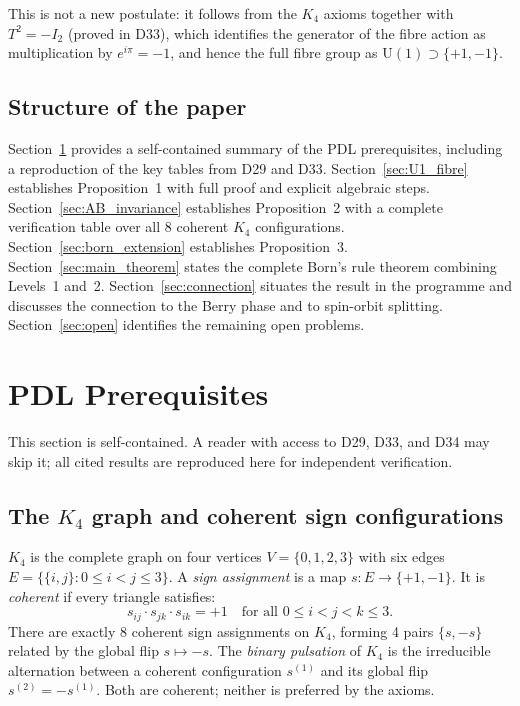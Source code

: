 \documentclass[12pt,a4paper]{article}
\begin{document}
This is not a new postulate: it follows from the $K_4$ axioms together with $T^2 = -I_2$
(proved in D33), which identifies the generator of the fibre action as multiplication
by $e^{i\pi} = -1$, and hence the full fibre group as $\mathrm{U}(1) \supset \{+1,-1\}$.

\subsection{Structure of the paper}

Section~\ref{sec:prereq} provides a self-contained summary of the PDL prerequisites,
including a reproduction of the key tables from D29 and D33. Section~\ref{sec:U1_fibre}
establishes Proposition~1 with full proof and explicit algebraic steps.
Section~\ref{sec:AB_invariance} establishes Proposition~2 with a complete verification
table over all 8 coherent $K_4$ configurations. Section~\ref{sec:born_extension}
establishes Proposition~3. Section~\ref{sec:main_theorem} states the complete Born's rule
theorem combining Levels~1 and~2. Section~\ref{sec:connection} situates the result
in the programme and discusses the connection to the Berry phase and to spin-orbit
splitting. Section~\ref{sec:open} identifies the remaining open problems.

\section{PDL Prerequisites}
\label{sec:prereq}

This section is self-contained. A reader with access to D29, D33, and D34 may skip it;
all cited results are reproduced here for independent verification.

\subsection{The \texorpdfstring{$K_4$}{K4} graph and coherent sign configurations}
\label{subsec:K4}

$K_4$ is the complete graph on four vertices $V = \{0,1,2,3\}$ with six edges
$E = \{\{i,j\} : 0 \leq i < j \leq 3\}$. A \emph{sign assignment} is a map
$s : E \to \{+1,-1\}$. It is \emph{coherent} if every triangle satisfies:
\begin{equation}
s_{ij} \cdot s_{jk} \cdot s_{ik} = +1 \quad \text{for all } 0 \leq i < j < k \leq 3.
\label{eq:coherence}
\end{equation}
There are exactly 8 coherent sign assignments on $K_4$, forming 4 pairs $\{s, -s\}$
related by the global flip $s \mapsto -s$. The \emph{binary pulsation} of $K_4$ is
the irreducible alternation between a coherent configuration $s^{(1)}$ and its global
flip $s^{(2)} = -s^{(1)}$. Both are coherent; neither is preferred by the axioms.
\end{document}
